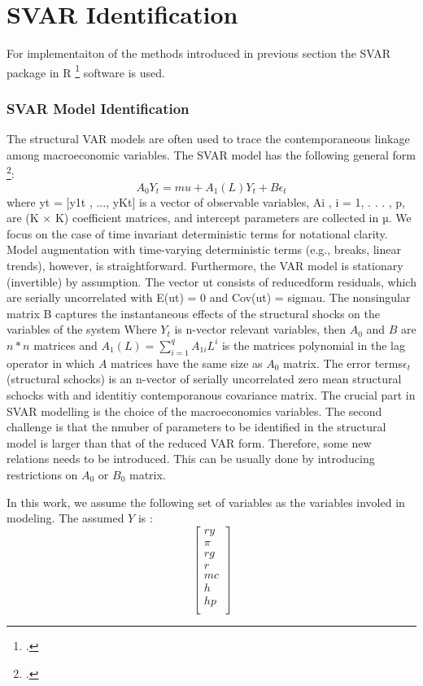 \newpage
\section{\ac{SVAR} Identification} \label{SVARIdentification}

For implementaiton of the methods introduced in previous section the SVAR package in R \footcite[See.][]{Lange2020} software is used.
\subsubsection{SVAR Model Identification}
The structural VAR models are often used to trace the contemporaneous linkage among macroeconomic variables. The SVAR model has the following general form  \footcite[See.][]{Lange2020}: 
\[ A_0 Y_t = mu+  A_1(L) Y_t + B \epsilon_t \]
where yt = [y1t
, ..., yKt]
 is a vector of observable variables, Ai
, i = 1, . . . , p, are (K × K)
coefficient matrices, and intercept parameters are collected in µ. We focus on the case of time
invariant deterministic terms for notational clarity. Model augmentation with time-varying
deterministic terms (e.g., breaks, linear trends), however, is straightforward. Furthermore,
the VAR model is stationary (invertible) by assumption. The vector ut consists of reducedform residuals, which are serially uncorrelated with E(ut) = 0 and Cov(ut) = sigmau. The
nonsingular matrix B captures the instantaneous effects of the structural shocks
on the variables of the system
 Where $Y_t$ is n-vector relevant variables, then $A_0$ and $B$ are $n * n$ matrices and $A_1(L) = \sum\limits_{i=1}^ qA_{1i} L^i $ is the matrices polynomial in the lag operator in which $A$ matrices have the same size as $A_0$ matrix. The error terms$\epsilon_t$ (structural schocks) is an n-vector of serially uncorrelated zero mean structural schocks with and identitiy contemporanous covariance matrix. The crucial part in SVAR modelling is the choice of the macroeconomics variables. The second challenge is that the nmuber of parameters to be identified in the structural model is larger than that of the reduced VAR form. Therefore, some new relations needs to be introduced. This can be usually done by introducing restrictions on $A_0$ or $B_0$ matrix. 

In this work, we assume the following set of variables as the variables involed in modeling. 
The assumed $Y$ is :
\[ 
 \begin{bmatrix}
        ry \\ 
        \pi \\
        rg \\
        r \\
        mc \\
        h \\
        hp \\
  \end{bmatrix}
\]


